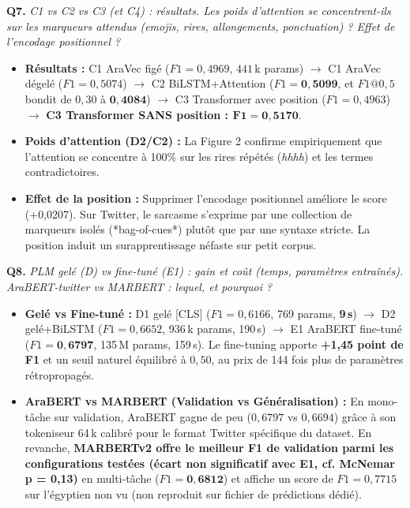 \documentclass[10pt,a4paper]{article}
\newcommand{\questiontitle}[2]{%
  \noindent\textbf{#1.} \textit{#2}\par\vspace{1.5pt}%
}
\begin{document}
\questiontitle{Q7}{C1 vs C2 vs C3 (et C4) : résultats. Les poids d'attention se concentrent-ils sur les marqueurs attendus (emojis, rires, allongements, ponctuation) ? Effet de l'encodage positionnel ?}
\begin{tcolorbox}[reponsebox]
  \begin{itemize}
    \item \textbf{Résultats :} C1 AraVec figé ($F1=0{,}4969$, $441$\,k params) $\rightarrow$ C1 AraVec dégelé ($F1=0{,}5074$) $\rightarrow$ C2 BiLSTM+Attention ($F1=\mathbf{0{,}5099}$, et $F1@0{,}5$ bondit de $0{,}30$ à $\mathbf{0{,}4084}$) $\rightarrow$ C3 Transformer avec position ($F1=0{,}4963$) $\rightarrow$ \textbf{C3 Transformer SANS position : $\mathbf{F1 = 0{,}5170}$}.
    \item \textbf{Poids d'attention (D2/C2) :} La Figure 2 confirme empiriquement que l'attention se concentre à 100\% sur les rires répétés (\textit{hhhh}) et les termes contradictoires.
    \item \textbf{Effet de la position :} Supprimer l'encodage positionnel améliore le score (+0,0207). Sur Twitter, le sarcasme s'exprime par une collection de marqueurs isolés (*bag-of-cues*) plutôt que par une syntaxe stricte. La position induit un surapprentissage néfaste sur petit corpus.
  \end{itemize}
\end{tcolorbox}

\questiontitle{Q8}{PLM gelé (D) vs fine-tuné (E1) : gain et coût (temps, paramètres entraînés). AraBERT-twitter vs MARBERT : lequel, et pourquoi ?}
\begin{tcolorbox}[reponsebox]
  \begin{itemize}
    \item \textbf{Gelé vs Fine-tuné :} D1 gelé [CLS] ($F1=0{,}6166$, 769 params, \textbf{9\,s}) $\rightarrow$ D2 gelé+BiLSTM ($F1=0{,}6652$, 936\,k params, 190\,s) $\rightarrow$ E1 AraBERT fine-tuné ($F1=\mathbf{0{,}6797}$, 135\,M params, 159\,s). Le fine-tuning apporte \textbf{+1,45 point de F1} et un seuil naturel équilibré à $0{,}50$, au prix de 144 fois plus de paramètres rétropropagés.
    \item \textbf{AraBERT vs MARBERT (Validation vs Généralisation) :} En mono-tâche sur validation, AraBERT gagne de peu ($0{,}6797$ vs $0{,}6694$) grâce à son tokeniseur 64\,k calibré pour le format Twitter spécifique du dataset. En revanche, \textbf{MARBERTv2 offre le meilleur F1 de validation parmi les configurations testées (écart non significatif avec E1, cf. McNemar p = 0,13)} en multi-tâche ($F1=\mathbf{0{,}6812}$) et affiche un score de $F1=0{,}7715$ sur l'égyptien non vu (non reproduit sur fichier de prédictions dédié).
  \end{itemize}
\end{tcolorbox}
\end{document}
